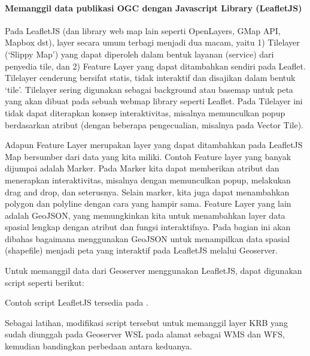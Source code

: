 \documentclass[letterpaper,10pt,english]{sphinxmanual}
\begin{document}
\paragraph{Memanggil data publikasi OGC dengan Javascript Library (LeafletJS)}
\label{\detokenize{sesi3/konsumsiogc:memanggil-data-publikasi-ogc-dengan-javascript-library-leafletjs}}
Pada LeafletJS (dan library web map lain seperti OpenLayers, GMap API, Mapbox dst), layer secara umum terbagi menjadi dua macam, yaitu 1) Tilelayer (‘Slippy Map’) yang dapat diperoleh dalam bentuk layanan (service) dari penyedia tile, dan 2) Feature Layer yang dapat ditambahkan sendiri pada Leaflet. Tilelayer cenderung bersifat statis, tidak interaktif dan disajikan dalam bentuk ‘tile’. Tilelayer sering digunakan sebagai background atau basemap untuk peta yang akan dibuat pada sebuah webmap library seperti Leaflet. Pada Tilelayer ini tidak dapat diterapkan konsep interaktivitas, misalnya memunculkan popup berdasarkan atribut (dengan beberapa pengecualian, misalnya pada Vector Tile).

Adapun Feature Layer merupakan layer yang dapat ditambahkan pada LeafletJS Map bersumber dari data yang kita miliki. Contoh Feature layer yang banyak dijumpai adalah Marker. Pada Marker kita dapat memberikan atribut dan menerapkan interaktivitas, misalnya dengan memunculkan popup, melakukan drag and drop, dan seterusnya. Selain marker, kita juga dapat menambahkan polygon dan polyline dengan cara yang hampir sama. Feature Layer yang lain adalah GeoJSON, yang memungkinkan kita untuk menambahkan layer data spasial lengkap dengan atribut dan fungsi interaktifnya. Pada bagian ini akan dibahas bagaimana menggunakan GeoJSON untuk menampilkan data spasial (shapefile) menjadi peta yang interaktif pada LeafletJS melalui Geoserver.

Untuk memanggil data dari Geoserver menggunakan LeafletJS, dapat digunakan script seperti berikut:

\begin{sphinxVerbatim}[commandchars=\\\{\}]
        
         
\end{sphinxVerbatim}

Contoh script LeafletJS tersedia pada .

Sebagai latihan, modifikasi script tersebut untuk memanggil layer KRB yang sudah diunggah pada Geoserver WSL pada alamat  sebagai WMS dan WFS, kemudian bandingkan perbedaan antara keduanya.







\renewcommand{\indexname}{Index}
\printindex
\end{document}
